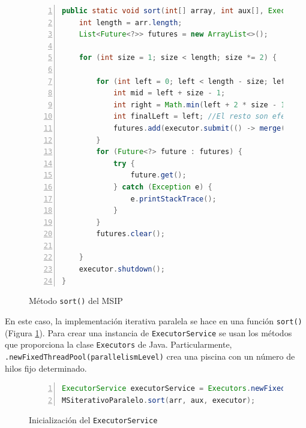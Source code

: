 \documentclass[titlepage]{article}
\begin{document}
\begin{figure}[h]
	\centering
	\begin{lstlisting}[language=java, frame=single, numbers=left]
public static void sort(int[] array, int aux[], ExecutorService executor) {
	int length = arr.length;
	List<Future<?>> futures = new ArrayList<>();
	
	for (int size = 1; size < length; size *= 2) {
		
		for (int left = 0; left < length - size; left += 2 * size) {
			int mid = left + size - 1;
			int right = Math.min(left + 2 * size - 1, length - 1);
			int finalLeft = left; //El resto son efectivamente finales
			futures.add(executor.submit(() -> merge(arr, aux, finalLeft, mid, right)));
		}
		for (Future<?> future : futures) {
			try {
				future.get();
			} catch (Exception e) {
				e.printStackTrace();
			}
		}
		futures.clear();
		
	}
	executor.shutdown();
}
	\end{lstlisting}
	
	\caption{Método \lstinline{sort()} del MSIP}
	\label{fig:MSIP_sort()}
\end{figure}

En este caso, la implementación iterativa paralela se hace en una función \lstinline|sort()| (Figura \ref{fig:MSIP_sort()}). Para crear una instancia de \lstinline|ExecutorService| se usan los métodos que proporciona la clase \lstinline|Executors| de Java. Particularmente, \lstinline|.newFixedThreadPool(parallelismLevel)| crea una piscina con un número de hilos fijo determinado.

\begin{figure}[h]
	\begin{lstlisting}[language=java, frame=single, numbers=left]
ExecutorService executorService = Executors.newFixedThreadPool(parallelismLevel);
MSiterativoParalelo.sort(arr, aux, executor);
	\end{lstlisting}
	\caption{Inicialización del \lstinline{ExecutorService}}
	\label{fig:creacionExecutorService}
\end{figure}
\end{document}
